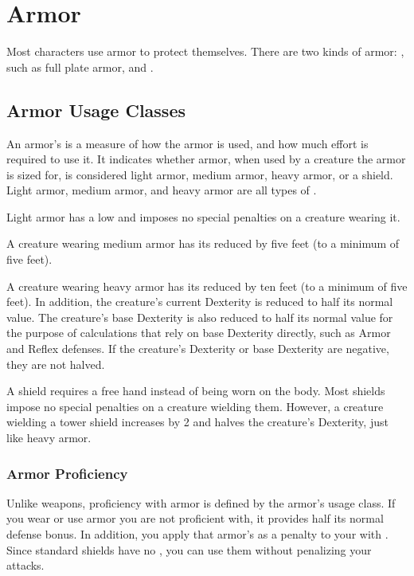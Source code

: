 \section{Armor}\label{Armor}

    Most characters use armor to protect themselves. There are two kinds of armor: , such as full plate armor, and .

    \subsection{Armor Usage Classes}\label{Armor Usage Classes}
        An armor's  is a measure of how the armor is used, and how much effort is required to use it.
        It indicates whether armor, when used by a creature the armor is sized for, is considered light armor, medium armor, heavy armor, or a shield.
        Light armor, medium armor, and heavy armor are all types of .

         Light armor has a low  and imposes no special penalties on a creature wearing it.

         A creature wearing medium armor has its  reduced by five feet (to a minimum of five feet).

         A creature wearing heavy armor has its  reduced by ten feet (to a minimum of five feet).
        In addition, the creature's current Dexterity is reduced to half its normal value.
        The creature's base Dexterity is also reduced to half its normal value for the purpose of calculations that rely on base Dexterity directly, such as Armor and Reflex defenses.
        If the creature's Dexterity or base Dexterity are negative, they are not halved.

         A shield requires a free hand instead of being worn on the body.
        Most shields impose no special penalties on a creature wielding them.
        However, a creature wielding a tower shield increases  by 2 and halves the creature's Dexterity, just like heavy armor.

        \subsubsection{Armor Proficiency}\label{Armor Proficiency}
            Unlike weapons, proficiency with armor is defined by the armor's usage class.
            If you wear or use armor you are not proficient with, it provides half its normal defense bonus.
            In addition, you apply that armor's  as a penalty to your  with .
            Since standard shields have no , you can use them without penalizing your attacks.

